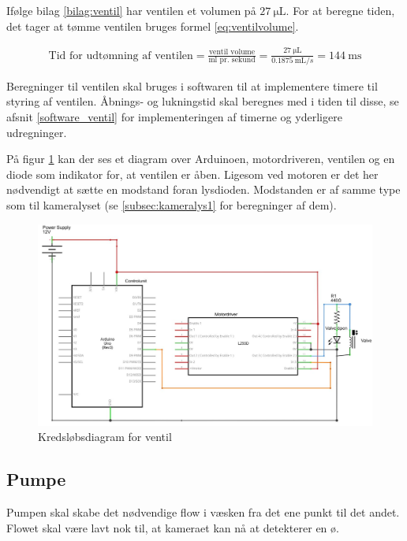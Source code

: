 Ifølge bilag \ref{bilag:ventil} har ventilen et volumen på $\SI{27}{\micro\liter}$. For at beregne tiden, det tager at tømme ventilen bruges formel \ref{eq:ventilvolume}. %

\begin{align}
\text{Tid for udtømning af ventilen} = \frac{\text{ventil volume}}{\text{ml pr. sekund}}=\frac{\SI{27}{\micro\liter}}{\SI{0,1875}{\milli\liter/s}}=\SI{144}{\milli\second}
\label{eq:ventilvolume}
\end{align}

Beregninger til ventilen skal bruges i softwaren til at implementere timere til styring af ventilen. Åbnings- og lukningstid skal beregnes med i tiden til disse, se afsnit \ref{software_ventil} for implementeringen af timerne og yderligere udregninger.

\newpage
 På figur \ref{fig:ventildiagram} kan der ses et diagram over Arduinoen, motordriveren, ventilen og en diode som indikator for, at ventilen er åben. Ligesom ved motoren er det her nødvendigt at sætte en modstand foran lysdioden. Modstanden er af samme type som til kameralyset (se \ref{subsec:kameralys1} for beregninger af dem).

\begin{figure}[H]
	\centering
	\includegraphics[width=1\textwidth]{billeder/Hardware/diagrammer/ventildiagram.JPG}
	\caption{Kredsløbsdiagram for ventil}
	\label{fig:ventildiagram}
\end{figure} 

\newpage
\subsection{Pumpe}
Pumpen skal skabe det nødvendige flow i væsken fra det ene punkt til det andet. Flowet skal være lavt nok til, at kameraet kan nå at detekterer en ø.

